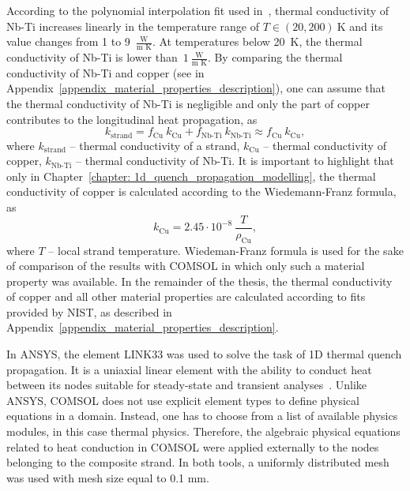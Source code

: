 According to the polynomial interpolation fit used in~\cite[p.~46]{material_props_for_heat_transfer_modelling_in_nb3sn_magnets}, thermal conductivity of Nb-Ti increases linearly in the temperature range of $T \in (20, 200)~\text{K}$ and its value changes from 1 to 9~$\frac{\text{W}}{\text{m K}}$. At temperatures below 20~K, the thermal conductivity of Nb-Ti is lower than~$1~\frac{\text{W}}{\text{m K}}$. By comparing the thermal conductivity of Nb-Ti and copper (see in Appendix~\ref{appendix_material_properties_description}), one can assume that the thermal conductivity of Nb-Ti is negligible and only the part of copper contributes to the longitudinal heat propagation, as 
\begin{equation}
    k_\text{strand} = f_\text{Cu} ~ k_\text{Cu} + f_\text{Nb-Ti} ~ k_\text{Nb-Ti} \approx  f_\text{Cu} ~ k_\text{Cu},
    \label{eqn: k_equiv}
\end{equation}
where $k_\text{strand}$ -- thermal conductivity of a strand, $k_\text{Cu}$ -- thermal conductivity of copper, $k_\text{Nb-Ti}$ -- thermal conductivity of Nb-Ti. It is important to highlight that only in Chapter~\ref{chapter: 1d_quench_propagation_modelling}, the thermal conductivity of copper is calculated according to the Wiedemann-Franz formula, as
\begin{equation}
    k_\text{Cu} = 2.45 \cdot 10^{-8} ~ \frac{T}{\rho_\text{Cu}},
    \label{eqn: k_cu_wiedemann_franz}
\end{equation}
where $T$ -- local strand temperature. Wiedeman-Franz formula is used for the sake of comparison of the results with COMSOL in which only such a material property was available. In the remainder of the thesis, the thermal conductivity of copper and all other material properties are calculated according to fits provided by NIST, as described in Appendix~\ref{appendix_material_properties_description}. 

In ANSYS, the element LINK33 was used to solve the task of 1D thermal quench propagation. It is a uniaxial linear element with the ability to conduct heat between its nodes suitable for steady-state and transient analyses~\cite{ansys_element_manual}. Unlike ANSYS, COMSOL does not use explicit element types to define physical equations in a domain. Instead, one has to choose from a list of available physics modules, in this case thermal physics. Therefore, the algebraic physical equations related to heat conduction in COMSOL were applied externally to the nodes belonging to the composite strand. In both tools, a uniformly distributed mesh was used with mesh size equal to 0.1 mm.

